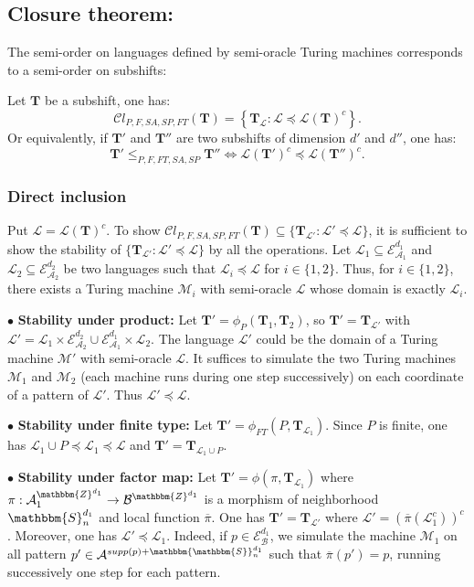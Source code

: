 \documentclass[proceedings]{stacs}
\theoremstyle{plain}\newtheorem{satz}[thm]{Satz}
\theoremstyle{definition}\newtheorem{crucial}[thm]{Crucial Definition}
\newcommand{\Z}{\mathbbm{Z}}
\renewcommand{\S}{\mathbbm{S}}
\newcommand{\A}{\mathcal{A}}
\newcommand{\B}{\mathcal{B}}
\newcommand{\E}{\mathcal{E}}
\newcommand{\T}{\mathbf{T}}
\newcommand{\TM}{\mathcal{M}}
\newcommand{\Lang}{\mathcal{L}}
\begin{document}
	\subsection{Closure theorem: }

The semi-order on languages defined by semi-oracle Turing machines corresponds to a semi-order on  subshifts:

\begin{theorem}\label{EquivalenceOrdre}
Let $\T$ be a subshift, one has:
$$\mathcal{C}l_{P,F,SA,SP,FT}(\T)=\left\{ \T_{\Lang} : \Lang\preceq \Lang(\T)^c\right\}.$$
Or equivalently, if $\T'$ and $\T''$ are two subshifts of dimension $d'$ and $d''$, one has:
$$\T' \leq_{P,F,FT,SA,SP}\T'' \Longleftrightarrow \Lang(\T')^c\preceq \Lang(\T'')^c.$$
\end{theorem}





\subsubsection{Direct inclusion} Put $\Lang=\Lang(\T)^c$. To show $\mathcal{C}l_{P,F,SA,SP,FT}(\T)\subseteq\{ \T_{\Lang'} : \Lang'\preceq \Lang\}$, it is sufficient to show the stability of $\{ \T_{\Lang'}: \Lang'\preceq \Lang\}$ by all the operations. Let $\Lang_1\subseteq\E^{d_1}_{\A_1}$ and $\Lang_2\subseteq\E^{d_2}_{\A_2}$ be two languages such that $\Lang_i\preceq \Lang$ for $i\in\{1,2\}$. Thus, for $i\in\{1,2\}$, there exists a Turing machine $\TM_i$ with semi-oracle $\Lang$ whose domain is exactly $\Lang_i$.

$\bullet$ \textbf{Stability under product:}
Let $\T'=\phi_P(\T_1,\T_2)$, so $\T'=\T_{\Lang'}$ with $\Lang'=\Lang_1\times\E^{d_2}_{\A_2}\cup\E^{d_1}_{\A_1}\times\Lang_2$. The language $\Lang'$ could be the domain of a Turing machine $\TM'$ with semi-oracle $\Lang$. It suffices to simulate the two Turing machines $\TM_1$ and $\TM_2$ (each machine runs during one step successively) on each coordinate of a pattern of $\Lang'$. Thus $\Lang'\preceq\Lang$.

$\bullet$ \textbf{Stability under finite type:}
Let $\T'=\phi_{FT}(P,\T_{\Lang_1})$. Since $P$ is finite, one has $\Lang_1\cup P\preceq\Lang_1\preceq\Lang$ and $\T'=\T_{\Lang_1\cup P}$.

$\bullet$ \textbf{Stability under factor map:} Let $\T'=\phi(\pi,\T_{\Lang_1})$ where $\pi:\A_1^{\Z^{d_1}}\rightarrow \B^{\Z^{d_1}}$ is a morphism of neighborhood $\S_n^{d_1}$ and local function $\overline{\pi}$. One has $\T'=\T_{\Lang'}$ where $\Lang'=(\overline{\pi}(\Lang_1^c))^c$. Moreover, one has $\Lang'\preceq\Lang_1$. Indeed, if $p\in\E^{d_1}_{\B}$, we simulate the machine $\TM_1$ on all pattern $p'\in\A^{supp(p)+\mathbbm{\S}_n^{d_1}}$ such that $\overline{\pi}(p')=p$, running successively one step for each pattern. 
\end{document}
